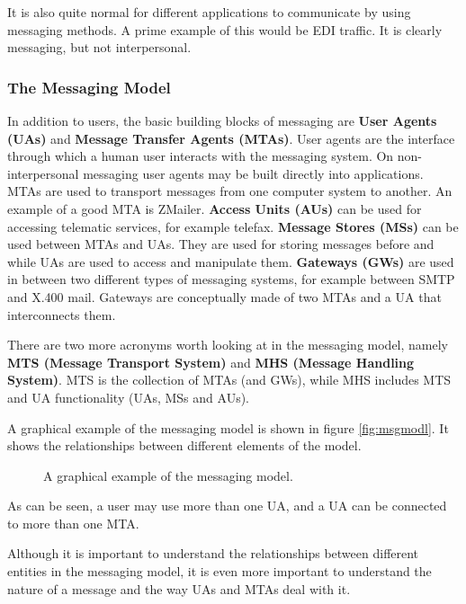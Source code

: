 It is also quite normal for different applications to communicate by using
messaging methods.
A prime example of this would be EDI traffic. It is clearly messaging,
but not interpersonal.



\subsubsection{The Messaging Model}

In addition to users, the basic building blocks of messaging are
{\bf User Agents (UAs)} and {\bf Message Transfer Agents (MTAs)}.
User agents are the interface through which a human user interacts with
the messaging system.
On non-interpersonal messaging user agents may be built directly into
applications.
MTAs are used to transport messages from one computer system to another.
An example of a good MTA is ZMailer. 
{\bf Access Units (AUs)} can be used for accessing telematic services,
for example telefax. 
{\bf Message Stores (MSs)} can be used between MTAs and UAs.
They are used for storing messages before and while UAs are used
to access and manipulate them.
{\bf Gateways (GWs)} are used in between two different types
of messaging systems, for example between SMTP and X.400 mail.
Gateways are conceptually made of two MTAs and a UA that interconnects them.

There are two more acronyms worth looking at in the messaging model,
namely {\bf MTS (Message Transport System)} and
{\bf MHS (Message Handling System)}.
MTS is the collection of MTAs (and GWs),
while MHS includes MTS and UA functionality (UAs, MSs and AUs).


A graphical example of the messaging model is shown in figure
\vref{fig:msgmodl}.  It shows the relationships between different
elements of the model.

\begin{figure}[ht]
  \centering
  \caption{\label{fig:msgmodl}A graphical example of the messaging model.}
\end{figure}

As can be seen, a user may use more than one UA, and a UA can be connected 
to more than one MTA.

Although it is important to understand the relationships between different 
entities in the messaging model, it is even more important to understand the 
nature of a message and the way UAs and MTAs deal with it.


